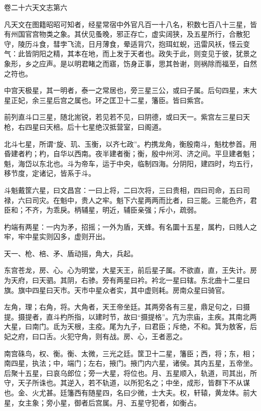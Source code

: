 \documentclass[12pt,UTF8]{ctexbook}
\begin{document}
卷二十六天文志第六



凡天文在图籍昭昭可知者，经星常宿中外官凡百一十八名，积数七百八十三星，皆有州国官宫物类之象。其伏见蚤晚，邪正存亡，虚实阔狭，及五星所行，合散犯守，陵历斗食，彗孛飞流，日月薄食，晕适背穴，抱珥虹蜺，迅雷风袄，怪云变气：此皆阴阳之精，其本在地，而上发于天者也。政失于此，则变见于彼，犹景之象形，乡之应声。是以明君睹之而寤，饬身正事，思其咎谢，则祸除而福至，自然之符也。



中宫天极星，其一明者，泰一之常居也，旁三星三公，或曰子属。后句四星，末大星正妃，余三星后宫之属也。环之匡卫十二星，籓臣。皆曰紫宫。



前列直斗口三星，随北耑锐，若见若不见，曰阴德，或曰天一。紫宫左三星曰天枪，右四星曰天棓。后十七星绝汉抵营室，曰阁道。



北斗七星，所谓“旋、玑、玉衡，以齐七政”。杓携龙角，衡殷南斗，魁枕参首。用昏建者杓；杓，自华以西南。夜半建者衡；衡，殷中州河、济之间。平旦建者魁；魁，海岱以东北也。斗为帝车，运于中央，临制四海。分阴阳，建四时，均五行，移节度，定诸记，皆系于斗。



斗魁戴筐六星，曰文昌宫：一曰上将，二曰次将，三曰贵相，四曰司命，五曰司禄，六曰司灾。在魁中，贵人之牢。魁下六星两两而比者，曰三能。三能色齐，君臣和；不齐，为乖戾。柄辅星，明近，辅臣亲强；斥小，疏弱。



杓端有两星：一内为矛，招摇；一外为盾，天蜂。有名圜十五星，属杓，曰贱人之牢，牢中星实则囚多，虚则开出。



天一、枪、棓、矛、盾动摇，角大，兵起。



东宫苍龙，房、心。心为明堂，大星天王，前后星子属。不欲直，直，王失计。房为天府，曰天驷。其阴，右骖。旁有两星曰衿。衿北一星曰辖。东北曲十二星曰旗。旗中四星曰天市。天市中星众者实，其中虚则耗。房南众星曰骑官。



左角，理；右角，将。大角者，天王帝坐廷。其两旁各有三星，鼎足句之，曰摄提。摄提者，直斗杓所指，以建时节，故曰“摄提格”。亢为宗庙，主疾。其南北两大星，曰南门。氐为天根，主疫。尾为九子，曰君臣；斥绝，不和。箕为敖客，后妃之府，曰口舌。火犯守角，则有战。房、心，王者恶之。



南宫硃鸟，权、衡。衡、太微，三光之廷。筐卫十二星，籓臣；西，将；东，相；南四星，执法；中，端门；左右，掖门。掖门内六星，诸侯。其内五星，五帝坐。后聚十五星，曰哀乌郎位；旁一大星，将位也。月、五星顺入，轨道，司其出，所守，天子所诛也。其逆入，若不轨道，以所犯名之；中坐，成形，皆群下不从谋也。金、火尤甚。廷籓西有随星四，名曰少微，士大夫。权，轩辕，黄龙体。前大星，女主象；旁小星，御者后宫属。月、五星守犯者，如衡占。
\end{document}

